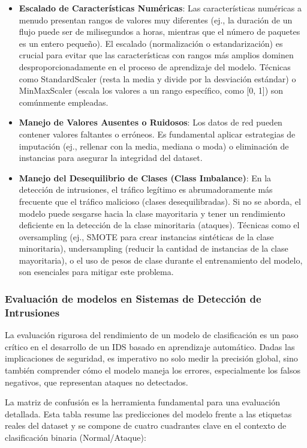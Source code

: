 \begin{itemize}
     \item\textbf{Escalado de Características Numéricas}: Las características numéricas a menudo presentan rangos de valores muy diferentes (ej., la duración de un flujo puede ser de milisegundos a horas, mientras que el número de paquetes es un entero pequeño). El escalado (normalización o estandarización) es crucial para evitar que las características con rangos más amplios dominen desproporcionadamente en el proceso de aprendizaje del modelo. Técnicas como StandardScaler (resta la media y divide por la desviación estándar) o MinMaxScaler (escala los valores a un rango específico, como [0, 1]) son comúnmente empleadas.
    
     \item\textbf{Manejo de Valores Ausentes o Ruidosos}: Los datos de red pueden contener valores faltantes o erróneos. Es fundamental aplicar estrategias de imputación (ej., rellenar con la media, mediana o moda) o eliminación de instancias para asegurar la integridad del dataset.
    
     \item\textbf{Manejo del Desequilibrio de Clases (Class Imbalance)}: En la detección de intrusiones, el tráfico legítimo es abrumadoramente más frecuente que el tráfico malicioso (clases desequilibradas). Si no se aborda, el modelo puede sesgarse hacia la clase mayoritaria y tener un rendimiento deficiente en la detección de la clase minoritaria (ataques). Técnicas como el oversampling (ej., SMOTE para crear instancias sintéticas de la clase minoritaria), undersampling (reducir la cantidad de instancias de la clase mayoritaria), o el uso de pesos de clase durante el entrenamiento del modelo, son esenciales para mitigar este problema.

\end{itemize}
\subsubsection{Evaluación de modelos en Sistemas de Detección de Intrusiones}

La evaluación rigurosa del rendimiento de un modelo de clasificación es un paso crítico en el desarrollo de un IDS basado en aprendizaje automático. Dadas las implicaciones de seguridad, es imperativo no solo medir la precisión global, sino también comprender cómo el modelo maneja los errores, especialmente los falsos negativos, que representan ataques no detectados.

La matriz de confusión es la herramienta fundamental para una evaluación detallada. Esta tabla resume las predicciones del modelo frente a las etiquetas reales del dataset y se compone de cuatro cuadrantes clave en el contexto de clasificación binaria (Normal/Ataque):

